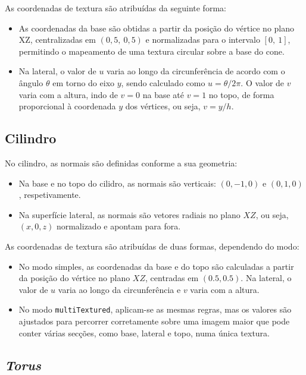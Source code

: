 \documentclass[12pt, a4paper]{article}
\begin{document}
As coordenadas de textura são atribuídas da seguinte forma:

\begin{itemize}
    \item As coordenadas da base são obtidas a partir da posição do vértice no plano XZ,
    centralizadas em $(0{,}5,\ 0{,}5)$ e normalizadas para o intervalo $[0,\ 1]$,
    permitindo o mapeamento de uma textura circular sobre a base do cone.
    \item Na lateral, o valor de $u$ varia ao longo da circunferência de acordo com o ângulo
    $\theta$ em torno do eixo $y$, sendo calculado como $u = \theta / 2\pi$. O valor de $v$
    varia com a altura, indo de $v = 0$ na base até $v = 1$ no topo, de forma proporcional à
    coordenada $y$ dos vértices, ou seja, $v = y/h$.
\end{itemize}

\subsection{Cilindro}

No cilindro, as normais são definidas conforme a sua geometria:

\begin{itemize}
    \item Na base e no topo do cilidro, as normais são verticais: $(0, -1, 0)$ e $(0, 1, 0)$,
    respetivamente.
    \item Na superfície lateral, as normais são vetores radiais no plano $XZ$, ou seja, $(x, 0, z)$
    normalizado e apontam para fora.
\end{itemize}

As coordenadas de textura são atribuídas de duas formas, dependendo do modo:

\begin{itemize}
    \item No modo simples, as coordenadas da base e do topo são calculadas a partir da posição do
    vértice no plano $XZ$, centradas em $(0.5, 0.5)$. Na lateral, o valor de $u$ varia ao longo da
    circunferência e $v$ varia com a altura.
    \item No modo \texttt{multiTextured}, aplicam-se as mesmas regras, mas os valores são ajustados
    para percorrer corretamente sobre uma imagem maior que pode conter várias secções, como base,
    lateral e topo, numa única textura.
\end{itemize}

\subsection{\emph{Torus}}
\end{document}
